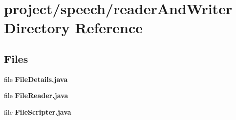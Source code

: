 \section{project/speech/reader\+And\+Writer Directory Reference}
\label{dir_2877e4666b87348387ed421271ef7519}
\subsection*{Files}
\begin{DoxyCompactItemize}
\item 
file {\bf File\+Details.\+java}
\item 
file {\bf File\+Reader.\+java}
\item 
file {\bf File\+Scripter.\+java}
\end{DoxyCompactItemize}
